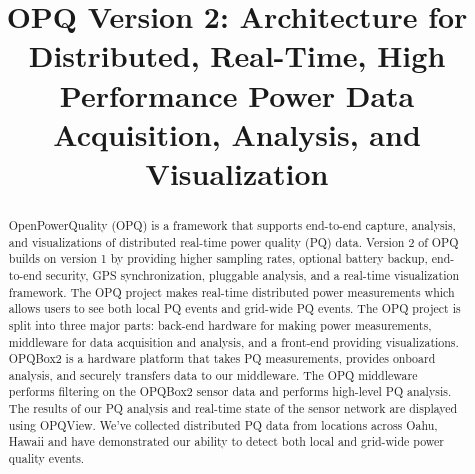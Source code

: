 \documentclass[a4paper, conference]{IEEEtran}
\begin{document}
%
\title{OPQ Version 2: Architecture for Distributed, Real-Time, High Performance Power Data Acquisition, Analysis, and Visualization}


\author{
}


\maketitle

\begin{abstract}
OpenPowerQuality (OPQ) is a framework that supports end-to-end capture, analysis, and visualizations of distributed real-time power quality (PQ) data. Version 2 of OPQ builds on version 1 by providing higher sampling rates, optional battery backup, end-to-end security, GPS synchronization, pluggable analysis, and a real-time visualization framework. The OPQ project makes real-time distributed power measurements which allows users to see both local PQ events and grid-wide PQ events. The OPQ project is split into three major parts: back-end hardware for making power measurements, middleware for data acquisition and analysis, and a front-end providing visualizations. OPQBox2 is a hardware platform that takes PQ measurements, provides onboard analysis, and securely transfers data to our middleware. The OPQ middleware performs filtering on the OPQBox2 sensor data and performs high-level PQ analysis. The results of our PQ analysis and real-time state of the sensor network are displayed using OPQView. We've collected distributed PQ data from locations across Oahu, Hawaii and have demonstrated our ability to detect both local and grid-wide power quality events.
\end{abstract}
\IEEEpeerreviewmaketitle
\end{document}
